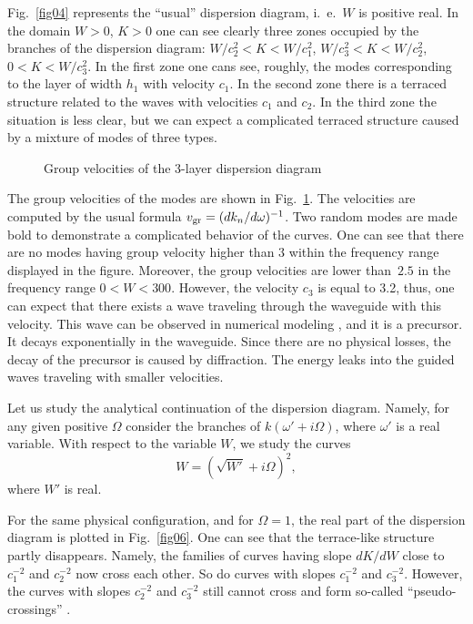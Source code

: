 \documentclass[12pt]{article}
\begin{document}
Fig.~\ref{fig04} represents the ``usual'' dispersion diagram, 
i.~e.\ $W$ is positive real. In the domain $W>0$, $K>0$ one can see clearly three zones 
occupied by the branches of the dispersion diagram: 
$W/c_2^2 <K < W/c_1^2$,
$W/c_3^2 <K < W/c_2^2$,
$0 <K < W/c_3^2$.
In the first zone one cans see, roughly, the modes corresponding to the layer of width $h_1$
with velocity $c_1$. In the second zone there is a terraced structure related to the waves with velocities $c_1$ and $c_2$. In the third zone the situation is less clear, but we can expect a complicated terraced structure caused by a mixture of modes of three types. 

\begin{figure}[ht]
\centerline{}
\caption{Group velocities of the 3-layer dispersion diagram} 
\label{fig05}
\end{figure}

The group velocities of the modes are shown in Fig.~\ref{fig05}. The velocities are computed by the usual formula $v_{\rm gr} = (dk_n / d\omega)^{-1}$. Two random modes are made bold 
to demonstrate a complicated behavior of the curves.      
One can see that there are no modes having group velocity higher than $3$
within the frequency range displayed in the figure. 
Moreover, the group velocities are lower than~$2.5$ in the frequency range $0<W<300$. However, the velocity $c_3$ is equal to 3.2, thus, one can expect that there exists a wave traveling through the waveguide with this velocity. This wave can be observed in numerical modeling \cite{Shanin},  and it is a precursor. It decays exponentially in the waveguide. 
Since there are no physical losses, the decay of the precursor is caused by diffraction. 
The energy leaks into the guided waves traveling with smaller velocities. 

Let us study the analytical continuation of the dispersion diagram. 
Namely, for any given positive $\Omega$ consider the branches of $k(\omega' + i\Omega)$, 
where $\omega'$ is a real variable. With respect 
to the variable $W$, we study the curves
\[
W = (\sqrt{W'} + i \Omega)^2,
\] 
where $W'$ is real. 

For the same physical configuration, and for $\Omega = 1$, the real part of the dispersion diagram is 
plotted in Fig.~\ref{fig06}.  One can see that the terrace-like structure partly disappears. 
Namely, the families of curves having slope $d K / d W $ close to $c_1^{-2}$ and $c_2^{-2}$
 now cross each other.
So do curves with slopes $c_1^{-2}$ and $c_3^{-2}$. However, the curves with slopes 
$c_2^{-2}$ and $c_3^{-2}$ still cannot cross and form so-called ``pseudo-crossings'' \cite{Shanin}.
\end{document}
